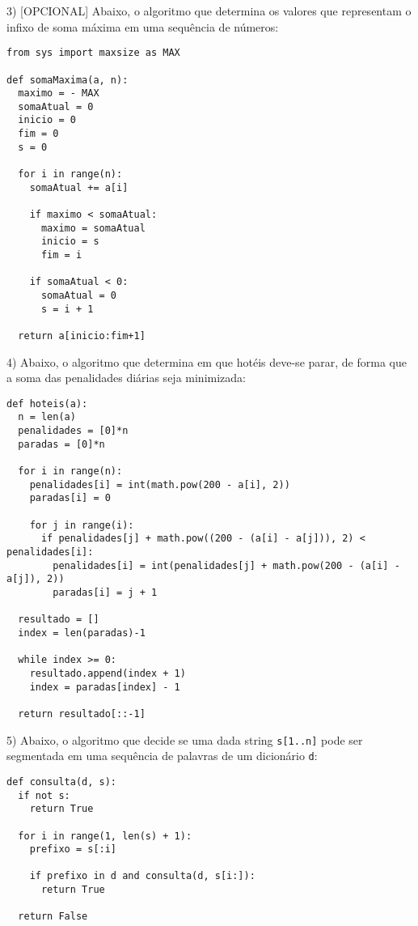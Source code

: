 \documentclass[]{article}
\begin{document}
\newpage

3) [OPCIONAL] Abaixo, o algoritmo que determina os valores que representam o infixo de soma máxima em uma sequência de números:

\begin{lstlisting}
from sys import maxsize as MAX

def somaMaxima(a, n):
  maximo = - MAX
  somaAtual = 0
  inicio = 0
  fim = 0
  s = 0

  for i in range(n):
    somaAtual += a[i]

    if maximo < somaAtual:
      maximo = somaAtual
      inicio = s
      fim = i

    if somaAtual < 0:
      somaAtual = 0
      s = i + 1
            
  return a[inicio:fim+1]
\end{lstlisting}

\newpage

4) Abaixo, o algoritmo que determina em que hotéis deve-se parar, de forma que a soma das penalidades diárias seja minimizada:

\begin{lstlisting}
def hoteis(a):
  n = len(a)
  penalidades = [0]*n
  paradas = [0]*n
    
  for i in range(n):
    penalidades[i] = int(math.pow(200 - a[i], 2))
    paradas[i] = 0
        
    for j in range(i):
      if penalidades[j] + math.pow((200 - (a[i] - a[j])), 2) < penalidades[i]:
        penalidades[i] = int(penalidades[j] + math.pow(200 - (a[i] - a[j]), 2))
        paradas[i] = j + 1
                
  resultado = []
  index = len(paradas)-1
    
  while index >= 0:
    resultado.append(index + 1)
    index = paradas[index] - 1
    
  return resultado[::-1]
\end{lstlisting}

\newpage

5) Abaixo, o algoritmo que decide se uma dada string \texttt{s[1..n]} pode ser segmentada em uma sequência de palavras de um dicionário \texttt{d}:

\begin{lstlisting}
def consulta(d, s):
  if not s:
    return True
 
  for i in range(1, len(s) + 1):
    prefixo = s[:i]
 
    if prefixo in d and consulta(d, s[i:]):
      return True
        
  return False
\end{lstlisting}
\end{document}

